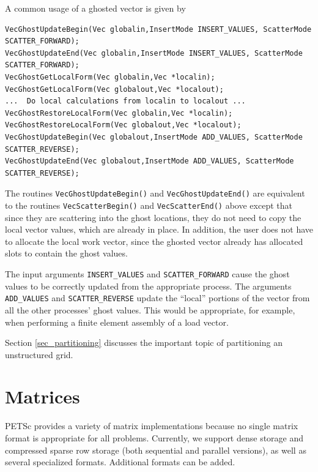 A common usage of a ghosted vector is given by
\begin{lstlisting}
VecGhostUpdateBegin(Vec globalin,InsertMode INSERT_VALUES, ScatterMode SCATTER_FORWARD);
VecGhostUpdateEnd(Vec globalin,InsertMode INSERT_VALUES, ScatterMode SCATTER_FORWARD);
VecGhostGetLocalForm(Vec globalin,Vec *localin);
VecGhostGetLocalForm(Vec globalout,Vec *localout);
...  Do local calculations from localin to localout ...
VecGhostRestoreLocalForm(Vec globalin,Vec *localin);
VecGhostRestoreLocalForm(Vec globalout,Vec *localout);
VecGhostUpdateBegin(Vec globalout,InsertMode ADD_VALUES, ScatterMode SCATTER_REVERSE);
VecGhostUpdateEnd(Vec globalout,InsertMode ADD_VALUES, ScatterMode SCATTER_REVERSE);
\end{lstlisting}

The routines \lstinline{VecGhostUpdateBegin()} and \lstinline{VecGhostUpdateEnd()} are equivalent to the routines \lstinline{VecScatterBegin()} and \lstinline{VecScatterEnd()}
above except that since they are scattering into the ghost locations, they do not need
to copy the local vector values, which are already in place. In addition, the user does not
have to allocate the local work vector, since the ghosted vector already has allocated
slots to contain the ghost values.

The input arguments \lstinline{INSERT_VALUES} and \lstinline{SCATTER_FORWARD}
cause the ghost values to be correctly updated from the appropriate
process. The arguments \lstinline{ADD_VALUES} and \lstinline{SCATTER_REVERSE}
update the ``local'' portions of the vector from all the other
processes' ghost values.  This would be appropriate, for example,
when performing a finite element assembly of a load vector.

Section \ref{sec_partitioning} discusses the important topic of partitioning
an unstructured grid.

\cleardoublepage
\chapter{Matrices}
\label{chapter_matrices}

PETSc provides a variety of matrix implementations because no
single matrix format is appropriate for all problems.  Currently, we
support dense storage and compressed sparse row storage (both
sequential and parallel versions), as well as several specialized
formats.  Additional formats can be added.


